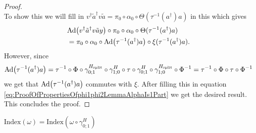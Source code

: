 \documentclass[12pt,a4paper,twoside]{article}
\numberwithin{equation}{section}
\begin{document}
\begin{proof}
\begin{equation}
	\end{equation}
	To show this we will fill in $v^\dagger\tilde{a}^\dagger v\tilde{a}=\pi_0\circ\alpha_0\circ\Theta(\tau^{-1}(a^\dagger)a)$ in this which gives
	\begin{align}
		&\Ad{v^\dagger \tilde{a}^\dagger v\tilde{a} y}\circ \pi_0\circ\alpha_0\circ\Theta(\tau^{-1}(a^\dagger)a)\\
		\label{eq:ProofOfPropertiesOfphi1phi2LemmaAlphaIs1Part}
		&=\pi_0\circ\alpha_0\circ\Ad{\tau^{-1}(a^\dagger)a}\circ\xi(\tau^{-1}(a^\dagger)a).
	\end{align}
	However, since
	\begin{equation}
		\Ad{\tau^{-1}(a^\dagger)a}=\tau^{-1}\circ\Phi\circ\gamma^{H_{\text{split}}}_{0;1}\circ\gamma^H_{1;0}\circ\tau\circ\gamma^H_{0;1}\circ\gamma^{H_{\text{split}}}_{1;0}\circ\Phi^{-1}=\tau^{-1}\circ\Phi\circ\tau\circ\Phi^{-1}
	\end{equation}
	we get that $\Ad{\tau^{-1}(a^\dagger)a}$ commutes with $\xi$. After filling this in equation \eqref{eq:ProofOfPropertiesOfphi1phi2LemmaAlphaIs1Part} we get the desired result. This concludes the proof.
\end{proof}
\begin{theorem}\label{thrm:IndexInvariantUnderLGA}
	$\textrm{Index}(\omega)=\textrm{Index}(\omega\circ\gamma^H_{0;1})$
\end{theorem}
\end{document}
